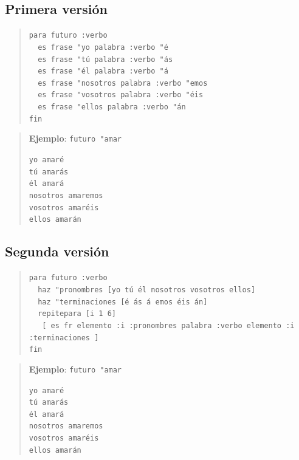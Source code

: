\subsection{Primera versi\'on}
\begin{quote}
   \verb+para futuro :verbo+ \\
   \verb+  es frase "yo palabra :verbo "+\texttt{\'e}\\
   \verb+  es frase "t+\texttt{\'u}\verb+ palabra :verbo "+\texttt{\'as}\\
   \verb+  es frase "+\texttt{\'el}\verb+ palabra :verbo "+\texttt{\'a}\\
   \verb+  es frase "nosotros palabra :verbo "emos+\\
   \verb+  es frase "vosotros palabra :verbo "+\texttt{\'eis}\\
   \verb+  es frase "ellos palabra :verbo "+\texttt{\'an}\\
   \verb+fin+\end{quote}
\begin{quote}
   \noindent \textbf{Ejemplo}: \verb+futuro "amar+

   \texttt{yo amar\'e}\\
   \texttt{t\'u amar\'as}\\
   \texttt{\'el amar\'a}\\
   \texttt{nosotros amaremos}\\
   \texttt{vosotros amar\'eis}\\
   \texttt{ellos amar\'an}
\end{quote}

\subsection{Segunda versi\'on}

\begin{quote}
   \verb+para futuro :verbo+\\
   \verb+  haz "pronombres [yo +\texttt{t\'u \'el nosotros vosotros ellos]}\\
   \verb+  haz "terminaciones [+\texttt{\'e \'as \'a emos \'eis \'an]}\\
   \verb+  repitepara [i 1 6]+\\
   \verb+   [ es fr elemento :i :pronombres palabra :verbo elemento :i :terminaciones ]+\\
   \verb+fin+ \end{quote}
\begin{quote}
   \noindent \textbf{Ejemplo}: \verb+futuro "amar+

   \texttt{yo amar\'e}\\
   \texttt{t\'u amar\'as}\\
   \texttt{\'el amar\'a}\\
   \texttt{nosotros amaremos}\\
   \texttt{vosotros amar\'eis}\\
   \texttt{ellos amar\'an}
\end{quote}


